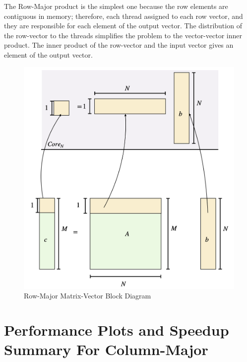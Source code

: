 The Row-Major product is the simplest one because the row elements 
are contiguous in memory; therefore, each thread assigned to each 
row vector, and they are responsible for each element of the output 
vector. The distribution of the row-vector to the threads simplifies 
the problem to the vector-vector inner product. The inner product of 
the row-vector and the input vector gives an element of the output vector.

\begin{figure}[htb]
    \centering
    \caption{Row-Major Matrix-Vector Block Diagram}
    \includegraphics[width=15cm]{../assets/mtv/row_major/block_diagram.png} %
\end{figure}

\clearpage
\section{Performance Plots and Speedup Summary For Column-Major}

